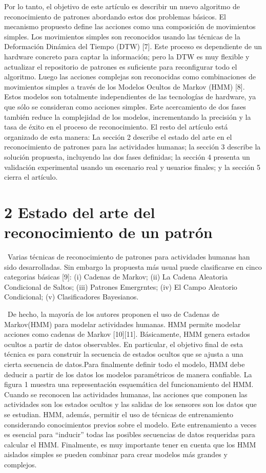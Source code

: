 \documentclass{paper}
\begin{document}
Por lo tanto, el objetivo de este artículo es describir un nuevo algoritmo de reconocimiento de patrones abordando estos dos problemas básicos. El mecanismo propuesto define las acciones como una composición de movimientos simples. Los movimientos simples son reconocidos usando las técnicas de la Deformación Dinámica del Tiempo (DTW) [7]. Este proceso es dependiente de un hardware concreto para captar la información; pero la DTW es muy flexible y actualizar el repositorio de patrones es suficiente para reconfigurar todo el algoritmo. Luego las acciones complejas son reconocidas como combinaciones de movimientos simples a través de los Modelos Ocultos de Markov (HMM) [8]. Estos modelos son totalmente independientes de las tecnologías de hardware, ya que sólo se consideran como acciones simples. Este acercamiento de dos fases también reduce la complejidad de los modelos, incrementando la precisión y la tasa de éxito en el proceso de reconocimiento.
El resto del artículo está organizado de esta manera: La sección 2 describe el estado del arte en el reconocimiento de patrones para las actividades humanas; la sección 3 describe la solución propuesta, incluyendo las dos fases definidas; la sección 4 presenta un validación experimental usando un escenario real y usuarios finales; y la sección 5 cierra el artículo.


\section*{2  Estado del arte del reconocimiento de un patrón}
\ Varias técnicas de reconocimiento de patrones para actividades humanas han sido desarrolladas. Sin embargo la propuesta más usual puede clasificarse en cinco categorias básicas [9]: (i) Cadenas de Markov; (ii) La Cadena Aleatoria 
Condicional de Saltos; (iii) Patrones Emergrntes; (iv) El Campo Aleatorio Condicional; (v) Clasificadores Bayesianos.

\ De hecho, la mayoría de los autores proponen el uso de Cadenas de Markov(HMM) para modelar actividades humanas.
      HMM permite modelar acciones como cadenas de Markov [10][11]. Básicamente,
HMM genera estados ocultos a partir de datos observables.
En particular, el objetivo final de
esta técnica es para construir la secuencia de estados ocultos que se ajusta a una cierta secuencia de datos.Para finalmente definir todo el modelo, HMM debe deducir a partir de los datos los modelos paramétricos de manera confiable. La figura 1  muestra una representación esquemática del funcionamiento del HMM. Cuando se reconocen las actividades humanas, las acciones que componen las actividades son los estados ocultos y las salidas de los sensores son los datos que se estudian. HMM, además, permitir el uso de técnicas de entrenamiento considerando conocimientos previos sobre el modelo. Este entrenamiento a veces es esencial para “inducir” todas las posibles secuencias de datos requeridas para calcular el HMM. Finalmente, es muy importante tener en cuenta que los HMM aislados simples se pueden combinar para crear modelos más grandes y complejos.
\end{document}
